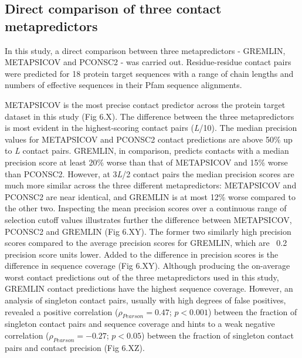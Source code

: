\subsection{Direct comparison of three contact metapredictors}
In this study, a direct comparison between three metapredictors - GREMLIN, METAPSICOV and PCONSC2 - was carried out. Residue-residue contact pairs were predicted for 18 protein target sequences with a range of chain lengths and numbers of effective sequences in their Pfam sequence alignments.

METAPSICOV is the most precise contact predictor across the protein target dataset in this study (Fig 6.X). The difference between the three metapredictors is most evident in the highest-scoring contact pairs (\textit{L}/10). The median precision values for METAPSICOV and PCONSC2 contact predictions are above 50\% up to \textit{L} contact pairs. GREMLIN, in comparison, predicts contacts with a median precision score at least 20\% worse than that of METAPSICOV and 15\% worse than PCONSC2. However, at 3\textit{L}/2 contact pairs the median precision scores are much more similar across the three different metapredictors: METAPSICOV and PCONSC2 are near identical, and GREMLIN is at most 12\% worse compared to the other two. Inspecting the mean precision scores over a continuous range of selection cutoff values illustrates further the difference between METAPSICOV, PCONSC2 and GREMLIN (Fig 6.XY). The former two similarly high precision scores compared to the average precision scores for GREMLIN, which are ~0.2 precision score units lower. Added to the difference in precision scores is the difference in sequence coverage (Fig 6.XY). Although producing the on-average worst contact predictions out of the three metapredictors used in this study, GREMLIN contact predictions have the highest sequence coverage. However, an analysis of singleton contact pairs, usually with high degrees of false positives, revealed a positive correlation ($\rho_{Pearson}=0.47$; $p<0.001$) between the fraction of singleton contact pairs and sequence coverage and hints to a weak negative correlation ($\rho_{Pearson}=-0.27$; $p<0.05$) between the fraction of singleton contact pairs and contact precision (Fig 6.XZ).
